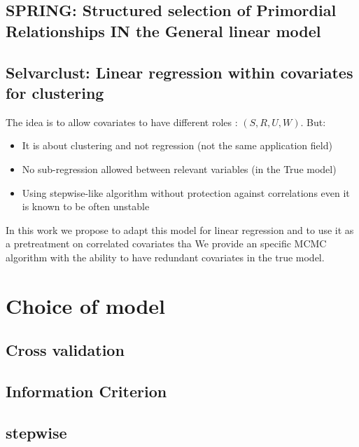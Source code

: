 \documentclass[12pt,a4paper]{report}
\begin{document}
			\cite{SURzellner}
		\subsection{SPRING: Structured selection of Primordial Relationships IN the General linear model}		%

			\cite{chiquetconf}			
			
		\subsection{Selvarclust: Linear regression within covariates for clustering}		%

			\cite{maugis2009variable}
			The idea is to allow covariates to have different roles : $(S,R,U,W)$.
			But:
			\begin{itemize}
				\item It is about clustering and not regression (not the same application field)
				\item No sub-regression allowed between relevant variables (in the True model)
				\item Using stepwise-like algorithm without protection against correlations \cite{raftery2006variable} even it is known to be often unstable \cite{miller2002subset}
			\end{itemize}
			In this work we propose to adapt this model for linear regression and to use it as a pretreatment on correlated covariates tha	
			We provide an specific MCMC algorithm with the ability to have redundant covariates in the true model.		 

		\section{Choice of model}
			\subsection{Cross validation}
				\cite{kohavi1995study,arlot2010survey}
			\subsection{Information Criterion}
			
			\cite{BIChuard}
			\subsection{stepwise}
			\cite{seber2012linear,miller2002subset}
\end{document}

